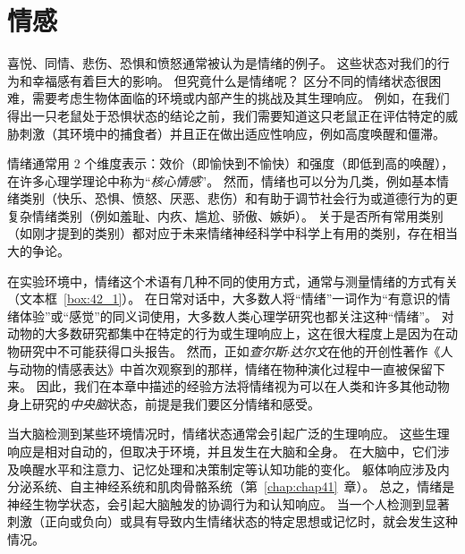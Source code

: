 \chapter{情感} \label{chap:chap42}

喜悦、同情、悲伤、恐惧和愤怒通常被认为是情绪的例子。
这些状态对我们的行为和幸福感有着巨大的影响。
但究竟什么是情绪呢？
区分不同的情绪状态很困难，需要考虑生物体面临的环境或内部产生的挑战及其生理响应。
例如，在我们得出一只老鼠处于恐惧状态的结论之前，我们需要知道这只老鼠正在评估特定的威胁刺激（其环境中的捕食者）并且正在做出适应性响应，例如高度唤醒和僵滞。


情绪通常用 2 个维度表示：效价（即愉快到不愉快）和强度（即低到高的唤醒），在许多心理学理论中称为“\textit{核心情感}”。
然而，情绪也可以分为几类，例如基本情绪类别（快乐、恐惧、愤怒、厌恶、悲伤）和有助于调节社会行为或道德行为的更复杂情绪类别（例如羞耻、内疚、尴尬、骄傲、嫉妒）。
关于是否所有常用类别（如刚才提到的类别）都对应于未来情绪神经科学中科学上有用的类别，存在相当大的争论。


在实验环境中，情绪这个术语有几种不同的使用方式，通常与测量情绪的方式有关（文本框~\ref{box:42_1}）。
在日常对话中，大多数人将“情绪”一词作为“有意识的情绪体验”或“感觉”的同义词使用，大多数人类心理学研究也都关注这种“情绪”。
对动物的大多数研究都集中在特定的行为或生理响应上，这在很大程度上是因为在动物研究中不可能获得口头报告。
然而，正如\textit{查尔斯$\cdot$达尔文}在他的开创性著作《人与动物的情感表达》中首次观察到的那样，情绪在物种演化过程中一直被保留下来。
因此，我们在本章中描述的经验方法将情绪视为可以在人类和许多其他动物身上研究的\textit{中央脑}状态，前提是我们要区分情绪和感受。


当大脑检测到某些环境情况时，情绪状态通常会引起广泛的生理响应。
这些生理响应是相对自动的，但取决于环境，并且发生在大脑和全身。
在大脑中，它们涉及唤醒水平和注意力、记忆处理和决策制定等认知功能的变化。
躯体响应涉及内分泌系统、自主神经系统和肌肉骨骼系统（第~\ref{chap:chap41}~章）。
总之，情绪是神经生物学状态，会引起大脑触发的协调行为和认知响应。
当一个人检测到显著刺激（正向或负向）或具有导致内生情绪状态的特定思想或记忆时，就会发生这种情况。


